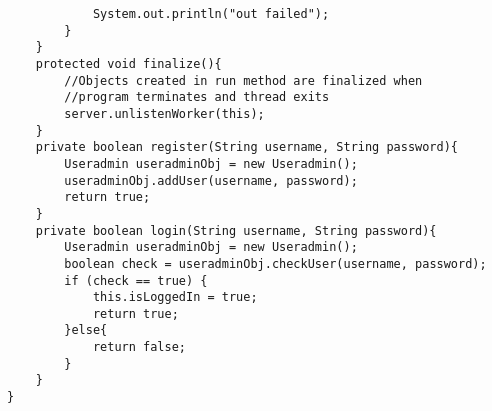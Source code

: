 \documentclass[10pt,a4paper]{article}
\begin{document}
\begin{verbatim}
            System.out.println("out failed");
        }
    }
    protected void finalize(){
        //Objects created in run method are finalized when 
        //program terminates and thread exits
        server.unlistenWorker(this);
    }
    private boolean register(String username, String password){
        Useradmin useradminObj = new Useradmin();
        useradminObj.addUser(username, password);
        return true;
    }
    private boolean login(String username, String password){
        Useradmin useradminObj = new Useradmin();
        boolean check = useradminObj.checkUser(username, password);
        if (check == true) {
            this.isLoggedIn = true;
            return true;
        }else{
            return false;
        }
    }
}
\end{verbatim}
\end{document}
